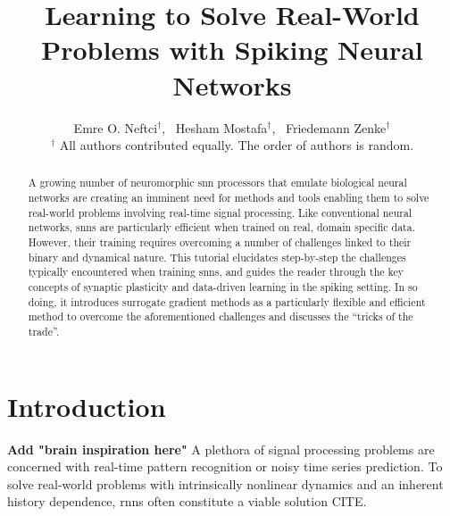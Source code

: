 \documentclass[journal,onecolumn,11pt]{IEEEtran}
\begin{document}
\title{Learning to Solve Real-World Problems with Spiking Neural Networks}

\author{Emre O. Neftci$^\dagger$,~
        Hesham Mostafa$^\dagger$,~
        Friedemann Zenke$^\dagger$\\
        {\small $^\dagger$ All authors contributed equally. The order of authors is random.}}%
%
{}
%
\maketitle
\IEEEpeerreviewmaketitle
%
\begin{abstract}
A growing number of neuromorphic \gls{snn} processors that emulate biological neural networks are creating an imminent need for methods and tools enabling them to solve real-world problems involving real-time signal processing.
Like conventional neural networks, \glspl{snn} are particularly efficient when trained on real, domain specific data. 
However, their training requires overcoming a number of challenges linked to their binary and dynamical nature.
This tutorial elucidates step-by-step the challenges typically encountered when training \glspl{snn}, and guides the reader through the key concepts of synaptic plasticity and data-driven learning in the spiking setting.
In so doing, it introduces surrogate gradient methods as a particularly flexible and efficient method to overcome the aforementioned challenges and discusses the ``tricks of the trade''. 
\end{abstract}

\section{Introduction}
\textbf{Add "brain inspiration here"}
A plethora of signal processing problems are concerned with real-time pattern
recognition or noisy time series prediction.  To solve real-world problems with
intrinsically nonlinear dynamics and an inherent history dependence, \glspl{rnn}
often constitute a viable solution CITE. %
\end{document}
